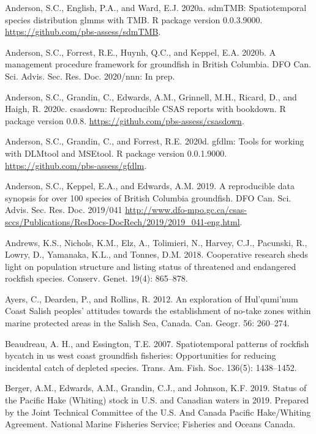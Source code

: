 \documentclass[11pt]{book}
\begin{document}
\leavevmode\hypertarget{ref-sdmtmb}{}%
Anderson, S.C., English, P.A., and Ward, E.J. 2020a. sdmTMB: Spatiotemporal species distribution glmms with TMB. R package version 0.0.3.9000. \url{https://github.com/pbs-assess/sdmTMB}.

\leavevmode\hypertarget{ref-anderson2020gfmp}{}%
Anderson, S.C., Forrest, R.E., Huynh, Q.C., and Keppel, E.A. 2020b. A management procedure framework for groundfish in British Columbia. DFO Can. Sci. Advis. Sec. Res. Doc. 2020/nnn: In prep.

\leavevmode\hypertarget{ref-csasdown}{}%
Anderson, S.C., Grandin, C., Edwards, A.M., Grinnell, M.H., Ricard, D., and Haigh, R. 2020c. csasdown: Reproducible CSAS reports with bookdown. R package version 0.0.8. \url{https://github.com/pbs-assess/csasdown}.

\leavevmode\hypertarget{ref-gfdlm}{}%
Anderson, S.C., Grandin, C., and Forrest, R.E. 2020d. gfdlm: Tools for working with DLMtool and MSEtool. R package version 0.0.1.9000. \url{https://github.com/pbs-assess/gfdlm}.

\leavevmode\hypertarget{ref-anderson2019synopsis}{}%
Anderson, S.C., Keppel, E.A., and Edwards, A.M. 2019. A reproducible data synopsis for over 100 species of British Columbia groundfish. DFO Can. Sci. Advis. Sec. Res. Doc. 2019/041 \url{http://www.dfo-mpo.gc.ca/csas-sccs/Publications/ResDocs-DocRech/2019/2019_041-eng.html}.

\leavevmode\hypertarget{ref-andrews2018}{}%
Andrews, K.S., Nichols, K.M., Elz, A., Tolimieri, N., Harvey, C.J., Pacunski, R., Lowry, D., Yamanaka, K.L., and Tonnes, D.M. 2018. Cooperative research sheds light on population structure and listing status of threatened and endangered rockfish species. Conserv. Genet. 19(4): 865--878.

\leavevmode\hypertarget{ref-ayers2012}{}%
Ayers, C., Dearden, P., and Rollins, R. 2012. An exploration of Hul'qumi'num Coast Salish peoples' attitudes towards the establishment of no-take zones within marine protected areas in the Salish Sea, Canada. Can. Geogr. 56: 260--274.

\leavevmode\hypertarget{ref-beaudreau2007}{}%
Beaudreau, A. H., and Essington, T.E. 2007. Spatiotemporal patterns of rockfish bycatch in us west coast groundfish fisheries: Opportunities for reducing incidental catch of depleted species. Trans. Am. Fish. Soc. 136(5): 1438--1452.

\leavevmode\hypertarget{ref-berger_2019}{}%
Berger, A.M., Edwards, A.M., Grandin, C.J., and Johnson, K.F. 2019. Status of the Pacific Hake (Whiting) stock in U.S. and Canadian waters in 2019. Prepared by the Joint Technical Committee of the U.S. And Canada Pacific Hake/Whiting Agreement. National Marine Fisheries Service; Fisheries and Oceans Canada.
\end{document}
